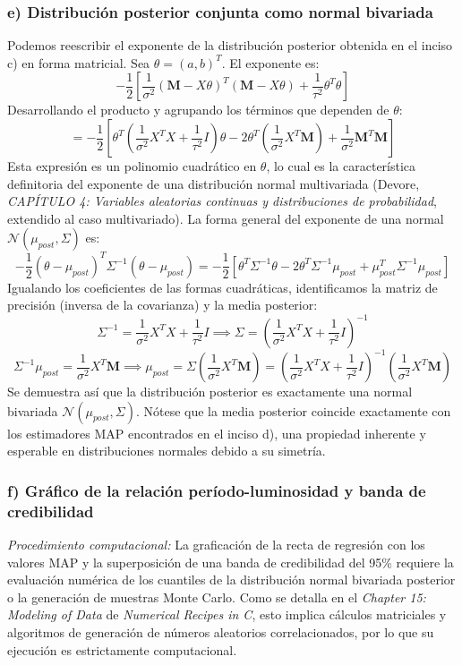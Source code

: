 \documentclass[12pt]{article}
\begin{document}
\subsubsection*{e) Distribución posterior conjunta como normal bivariada}
Podemos reescribir el exponente de la distribución posterior obtenida en el inciso c) en forma matricial. Sea $\theta = (a, b)^T$. El exponente es:
$$
-\frac{1}{2} \left[ \frac{1}{\sigma^2} (\mathbf{M} - X\theta)^T (\mathbf{M} - X\theta) + \frac{1}{\tau^2} \theta^T \theta \right]
$$
Desarrollando el producto y agrupando los términos que dependen de $\theta$:
$$
= -\frac{1}{2} \left[ \theta^T \left( \frac{1}{\sigma^2} X^T X + \frac{1}{\tau^2} I \right) \theta - 2 \theta^T \left( \frac{1}{\sigma^2} X^T \mathbf{M} \right) + \frac{1}{\sigma^2} \mathbf{M}^T \mathbf{M} \right]
$$
Esta expresión es un polinomio cuadrático en $\theta$, lo cual es la característica definitoria del exponente de una distribución normal multivariada (Devore, \textit{CAPÍTULO 4: Variables aleatorias continuas y distribuciones de probabilidad}, extendido al caso multivariado). La forma general del exponente de una normal $\mathcal{N}(\mu_{post}, \Sigma)$ es:
$$
-\frac{1}{2} (\theta - \mu_{post})^T \Sigma^{-1} (\theta - \mu_{post}) = -\frac{1}{2} \left[ \theta^T \Sigma^{-1} \theta - 2 \theta^T \Sigma^{-1} \mu_{post} + \mu_{post}^T \Sigma^{-1} \mu_{post} \right]
$$
Igualando los coeficientes de las formas cuadráticas, identificamos la matriz de precisión (inversa de la covarianza) y la media posterior:
$$
\Sigma^{-1} = \frac{1}{\sigma^2} X^T X + \frac{1}{\tau^2} I \implies \Sigma = \left( \frac{1}{\sigma^2} X^T X + \frac{1}{\tau^2} I \right)^{-1}
$$
$$
\Sigma^{-1} \mu_{post} = \frac{1}{\sigma^2} X^T \mathbf{M} \implies \mu_{post} = \Sigma \left( \frac{1}{\sigma^2} X^T \mathbf{M} \right) = \left( \frac{1}{\sigma^2} X^T X + \frac{1}{\tau^2} I \right)^{-1} \left( \frac{1}{\sigma^2} X^T \mathbf{M} \right)
$$
Se demuestra así que la distribución posterior es exactamente una normal bivariada $\mathcal{N}(\mu_{post}, \Sigma)$. Nótese que la media posterior coincide exactamente con los estimadores MAP encontrados en el inciso d), una propiedad inherente y esperable en distribuciones normales debido a su simetría.

\subsubsection*{f) Gráfico de la relación período-luminosidad y banda de credibilidad}
\textit{Procedimiento computacional:} La graficación de la recta de regresión con los valores MAP y la superposición de una banda de credibilidad del 95\% requiere la evaluación numérica de los cuantiles de la distribución normal bivariada posterior o la generación de muestras Monte Carlo. Como se detalla en el \textit{Chapter 15: Modeling of Data} de \textit{Numerical Recipes in C}, esto implica cálculos matriciales y algoritmos de generación de números aleatorios correlacionados, por lo que su ejecución es estrictamente computacional.
\end{document}
